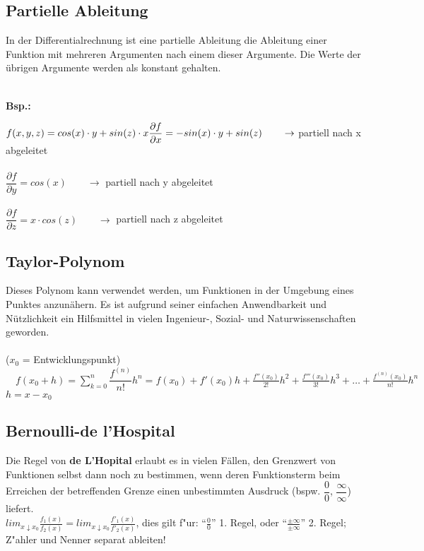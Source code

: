 \subsection{Partielle Ableitung}
In der Differentialrechnung ist eine partielle Ableitung die Ableitung einer Funktion mit mehreren Argumenten nach einem dieser Argumente. Die Werte der übrigen Argumente werden als konstant gehalten.\\\\
\begin{minipage}[t]{1cm}
	\textbf{Bsp.:}
\end{minipage}
\begin{minipage}[t]{16cm}
	$f(x,y,z) = cos(x) \cdot y + sin(z) \cdot x\\\\
	\dfrac{\partial f}{\partial x} = -sin(x) \cdot y + sin(z) \qquad \rightarrow$ partiell nach x abgeleitet\\\\
	$\dfrac{\partial f}{\partial y} = cos(x) \qquad \rightarrow$ partiell nach y abgeleitet\\\\
	$\dfrac{\partial f}{\partial z} = x \cdot cos(z) \qquad \rightarrow$ partiell nach z abgeleitet
\end{minipage}

\subsection{Taylor-Polynom}
Dieses Polynom kann verwendet werden, um Funktionen in der Umgebung eines Punktes anzunähern. Es ist aufgrund seiner einfachen Anwendbarkeit und Nützlichkeit ein Hilfsmittel in vielen Ingenieur-, Sozial- und Naturwissenschaften geworden.\\\\
($x_0$ = Entwicklungspunkt)$\quad f(x_0+h)= \sum\limits_{k=0}^{n} \dfrac{f^{(n)}}{n!} h^n=f(x_0) + f'(x_0)h + \frac{f''(x_0)}{2!}h^2 + \frac{f'''(x_0)}{3!}h^3 + \ldots + \frac{f^{(n)}(x_0)}{n!}h^n$\\
$ h = x-x_0$

\subsection{Bernoulli-de l'Hospital}
Die Regel von \textbf{\grqq de L'Hopital\grqq}  erlaubt es in vielen Fällen, den Grenzwert von Funktionen selbst dann noch zu bestimmen, wenn deren Funktionsterm beim Erreichen der betreffenden Grenze einen unbestimmten Ausdruck (bspw. $\dfrac{0}{0}$, $\dfrac{\infty}{\infty}$) liefert.\\
${lim} _{x\downarrow x_{0}} \frac{f_{1}(x)}{f_{2}(x)} = {lim} _{x\downarrow x_{0}} \frac{f'_{1}(x)}{f'_{2}(x)} $, dies gilt f"ur: "`$\frac{0}{0}$"' 1. Regel, oder "`$\frac{\pm\infty}{\pm\infty}$"' 2. Regel;   Z"ahler und Nenner separat ableiten!


